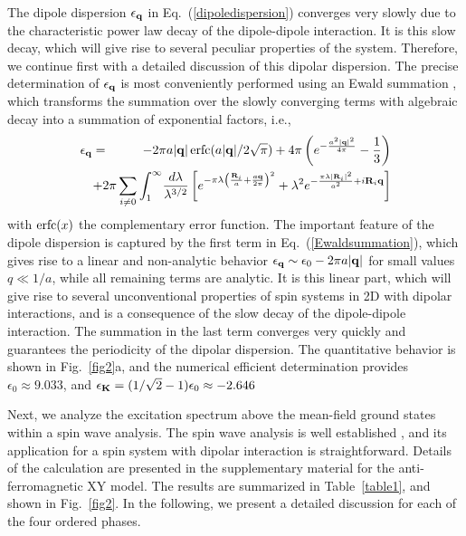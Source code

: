 The dipole dispersion $\epsilon_{\bf q}$ in Eq.~(\ref{dipoledispersion})
converges very slowly due to the characteristic power law decay of the dipole-dipole
interaction. It is this slow decay, which will give rise to several peculiar
properties of the system. Therefore, we continue first with a detailed discussion
of this dipolar dispersion.  The precise determination of $\epsilon_{\bf q}$ is
most conveniently performed using an Ewald summation \cite{bonsall59}, which transforms
the summation over the  slowly converging terms with algebraic decay into a summation of exponential factors, i.e.,
%
\begin{eqnarray}
   \epsilon_{\bf q}  & = & - 2 \pi a | {\bf q}|\,{\rm erfc}(a |{\bf q}|/2\sqrt{\pi})   + 4 \pi \left( e^{- \frac{a^2 |{\bf q}|^2}{4 \pi}} - \frac{1}{3}\right)      \label{Ewaldsummation}
\\
   & & \hspace{-20pt}+     2 \pi \sum_{i\neq 0} \int_{1}^{\infty} \! \frac{d \lambda}{ \lambda^{3/2}} \left[ e^{- \pi  \lambda \left(\frac{ {\bf R}_{i}}{a} + \frac{a {\bf q}}{2 \pi}\right)^2} +\lambda^{2}  e^{- \frac{\pi \lambda |{\bf R}_{i}|^2}{a^2}+ i {\bf R}_{i}{\bf q}}\right] \nonumber
   \end{eqnarray}
%
with ${\rm erfc}(x)$ the complementary error function. The important feature of the dipole
dispersion is captured by the first term in Eq.~(\ref{Ewaldsummation}), which
gives rise to a linear and non-analytic behavior $\epsilon_{\bf q} \sim
\epsilon_{0} - 2 \pi a |{\bf q}|$ for small values $q \ll 1/a $, while all
remaining terms are analytic. It is this linear part, which will give rise to
several unconventional properties of spin systems in 2D with dipolar
interactions, and is a consequence of the slow decay of the dipole-dipole
interaction. The summation in the last term converges very quickly and
guarantees the periodicity of the dipolar dispersion. The quantitative behavior
is shown in Fig.~\ref{fig2}a, and the numerical efficient determination provides
$\epsilon_{0}\approx 9.033$, and $\epsilon_{\bf K}=(1/\sqrt{2}-1)  \epsilon_{0}
\approx -2.646$



Next, we analyze the excitation spectrum above the mean-field ground states
within a spin wave analysis. The spin wave analysis is well
established \cite{kubo52,auerbachbook}, and its application for a spin system with dipolar
interaction is straightforward. Details of the calculation are presented in
the supplementary material for the anti-ferromagnetic XY model. The results are
summarized in Table~\ref{table1}, and shown in Fig.~\ref{fig2}. In the following, we present a detailed
discussion for each of the four ordered phases.




